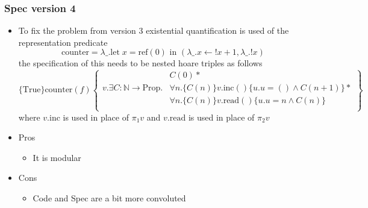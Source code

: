 \subsubsection{Spec version 4}
\begin{itemize}
  \item To fix the problem from version 3 existential quantification is used of the representation predicate
  \begin{equation*}
    \text{counter} = \lambda\_.\text{let} \; x = \text{ref}(0) \text{ in }(\lambda\_.x \leftarrow !x + 1, \lambda \_. !x)
  \end{equation*}
  the specification of this needs to be nested hoare triples as follows 
  \begin{equation*} 
    \{\text{True} \} \text{counter}(f) \left\{
      \begin{split} 
                                                & C(0) * \\
        v.\exists C: \mathbb N \to \text{Prop}. & \forall n. \{C(n)\} v.\text{inc}() \{u.u=() \land C(n+1)\} * \\
                                                & \forall n. \{C(n)\} v.\text{read}() \{u.u=n \land C(n)\}  \\
      \end{split}
      \right\}
  \end{equation*}
  where $v.\text{inc}$ is used in place of $\pi_1 v$ and $v.\text{read}$ is used in place of $\pi_2 v$ 
  \item Pros
  \begin{itemize}
  	\item It is modular 
  \end{itemize}
  \item Cons
  \begin{itemize}
  	\item Code and Spec are a bit more convoluted
  \end{itemize}
\end{itemize}

